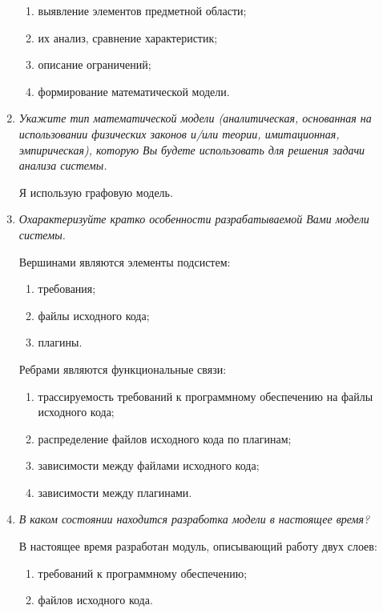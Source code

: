 \documentclass{article}
\begin{document}
\begin{enumerate}
        \begin{enumerate}
            \item выявление элементов предметной области;
            \item их анализ, сравнение характеристик;
            \item описание ограничений;
            \item формирование математической модели. 
        \end{enumerate}

        \item \textit{Укажите тип математической модели (аналитическая, основанная на использовании физических законов и/или теории, имитационная, эмпирическая), которую Вы будете использовать для решения задачи анализа системы.}

        Я использую графовую модель.

        \item \textit{Охарактеризуйте кратко особенности разрабатываемой Вами модели системы.}

        Вершинами являются элементы подсистем:
        \begin{enumerate}
            \item требования;
            \item файлы исходного кода;
            \item плагины.
        \end{enumerate}

        Ребрами являются функциональные связи:
        \begin{enumerate}
            \item трассируемость требований к программному обеспечению на файлы исходного кода;
            \item распределение файлов исходного кода по плагинам;
            \item зависимости между файлами исходного кода;
            \item зависимости между плагинами.
        \end{enumerate}

        \item \textit{В каком состоянии находится разработка модели в настоящее время?}

        В настоящее время разработан модуль, описывающий работу двух слоев:
        \begin{enumerate}
            \item требований к программному обеспечению;
            \item файлов исходного кода.
        \end{enumerate}


\end{enumerate}
\end{document}
